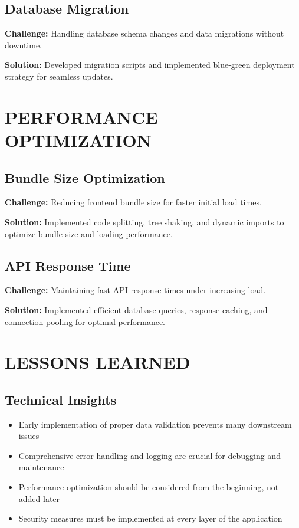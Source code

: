 \subsection{Database Migration}

\textbf{Challenge:} Handling database schema changes and data migrations without downtime.

\textbf{Solution:} Developed migration scripts and implemented blue-green deployment strategy for seamless updates.

\section{PERFORMANCE OPTIMIZATION}

\subsection{Bundle Size Optimization}

\textbf{Challenge:} Reducing frontend bundle size for faster initial load times.

\textbf{Solution:} Implemented code splitting, tree shaking, and dynamic imports to optimize bundle size and loading performance.

\subsection{API Response Time}

\textbf{Challenge:} Maintaining fast API response times under increasing load.

\textbf{Solution:} Implemented efficient database queries, response caching, and connection pooling for optimal performance.

\section{LESSONS LEARNED}

\subsection{Technical Insights}

\begin{itemize}
\item Early implementation of proper data validation prevents many downstream issues
\item Comprehensive error handling and logging are crucial for debugging and maintenance
\item Performance optimization should be considered from the beginning, not added later
\item Security measures must be implemented at every layer of the application
\end{itemize}

